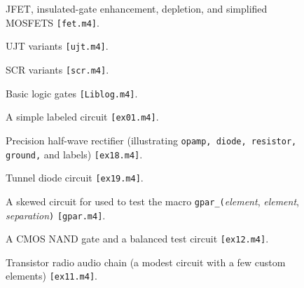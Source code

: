 \documentclass[11pt]{article}
\newcommand{\src}[1]{{\tt [#1]}}
\newcommand{\makepic}{\box\graph} %
\begin{document}
  \begin{figure}[h!t]
    \centerline{ \makepic}
    \caption{JFET, insulated-gate enhancement, depletion,
     and simplified MOSFETS
    \src{fet.m4}.}
  \end{figure}

  \begin{figure}[h!t]
    \centerline{ \makepic}
    \caption{UJT variants
    \src{ujt.m4}.}
  \end{figure}

  \begin{figure}[h!t]
    \centerline{ \makepic}
    \caption{SCR variants
    \src{scr.m4}.}
  \end{figure}

  \begin{figure}[h!t]
    \centerline{ \makepic}
    \caption{Basic logic gates
    \src{Liblog.m4}.}
  \end{figure}

  \begin{figure}[h!t]
    \centerline{ \makepic}
    \caption{A simple labeled circuit
    \src{ex01.m4}.}
  \end{figure}

  \begin{figure}[h!t]
    \centerline{ \makepic}
    \caption{Precision half-wave rectifier
      (illustrating {\tt opamp, diode, resistor, ground,} and labels)
    \src{ex18.m4}.}
  \end{figure}

  \begin{figure}[h!t]
    \centerline{ \makepic}
    \caption{ Tunnel diode circuit
    \src{ex19.m4}.}
  \end{figure}

  \begin{figure}[h!t]
    \centerline{ \makepic}
    \caption{ A skewed circuit for used to test the macro
      {\tt gpar\_(}{\sl element}, {\sl element}, {\sl separation}{\tt )}
    \src{gpar.m4}.}
  \end{figure}

  \begin{figure}[h!t]
    \centerline{ \makepic}
    \caption{ A CMOS NAND gate and a balanced test circuit
    \src{ex12.m4}.}
  \end{figure}

  \begin{figure}[h!t]
    \centerline{ \makepic}
    \caption{Transistor radio audio chain (a modest circuit with a few
      custom elements)
    \src{ex11.m4}.}
  \end{figure}
\end{document}
